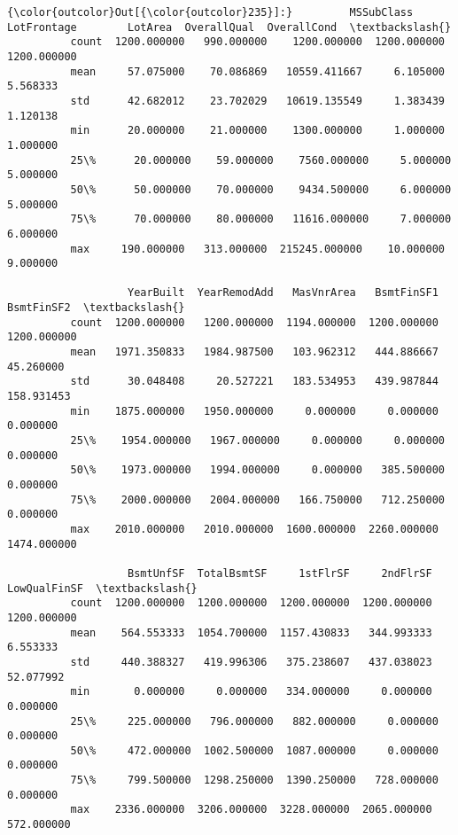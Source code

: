 \documentclass[11pt]{article}
\begin{document}
\begin{Verbatim}[commandchars=\\\{\}]
{\color{outcolor}Out[{\color{outcolor}235}]:}         MSSubClass  LotFrontage        LotArea  OverallQual  OverallCond  \textbackslash{}
          count  1200.000000   990.000000    1200.000000  1200.000000  1200.000000   
          mean     57.075000    70.086869   10559.411667     6.105000     5.568333   
          std      42.682012    23.702029   10619.135549     1.383439     1.120138   
          min      20.000000    21.000000    1300.000000     1.000000     1.000000   
          25\%      20.000000    59.000000    7560.000000     5.000000     5.000000   
          50\%      50.000000    70.000000    9434.500000     6.000000     5.000000   
          75\%      70.000000    80.000000   11616.000000     7.000000     6.000000   
          max     190.000000   313.000000  215245.000000    10.000000     9.000000   
          
                   YearBuilt  YearRemodAdd   MasVnrArea   BsmtFinSF1   BsmtFinSF2  \textbackslash{}
          count  1200.000000   1200.000000  1194.000000  1200.000000  1200.000000   
          mean   1971.350833   1984.987500   103.962312   444.886667    45.260000   
          std      30.048408     20.527221   183.534953   439.987844   158.931453   
          min    1875.000000   1950.000000     0.000000     0.000000     0.000000   
          25\%    1954.000000   1967.000000     0.000000     0.000000     0.000000   
          50\%    1973.000000   1994.000000     0.000000   385.500000     0.000000   
          75\%    2000.000000   2004.000000   166.750000   712.250000     0.000000   
          max    2010.000000   2010.000000  1600.000000  2260.000000  1474.000000   
          
                   BsmtUnfSF  TotalBsmtSF     1stFlrSF     2ndFlrSF  LowQualFinSF  \textbackslash{}
          count  1200.000000  1200.000000  1200.000000  1200.000000   1200.000000   
          mean    564.553333  1054.700000  1157.430833   344.993333      6.553333   
          std     440.388327   419.996306   375.238607   437.038023     52.077992   
          min       0.000000     0.000000   334.000000     0.000000      0.000000   
          25\%     225.000000   796.000000   882.000000     0.000000      0.000000   
          50\%     472.000000  1002.500000  1087.000000     0.000000      0.000000   
          75\%     799.500000  1298.250000  1390.250000   728.000000      0.000000   
          max    2336.000000  3206.000000  3228.000000  2065.000000    572.000000   
          

\end{Verbatim}
\end{document}
